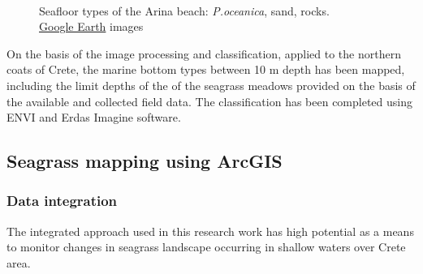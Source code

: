 \documentclass[11pt]{article}
\begin{document}
\begin{figure}
	\centering
	\\
	\caption{Seafloor types of the Arina beach: \textit{P.oceanica}, sand, rocks. \\ \href{http://www.google.com/earth/index.html}{Google Earth} images}
	\label{fig:38}
\end{figure}

On the basis of the image processing and classification, applied to the northern coats of Crete, the
marine bottom types between 10 m depth has been mapped, including the limit depths of the of the
seagrass meadows provided on the basis of the available and collected field data. The classification
has been completed using ENVI and Erdas Imagine software.

\subsection{Seagrass mapping using ArcGIS}

\subsubsection{Data integration}
The integrated approach used in this research work has high potential as a means to monitor changes
in seagrass landscape occurring in shallow waters over Crete area.
\end{document}
